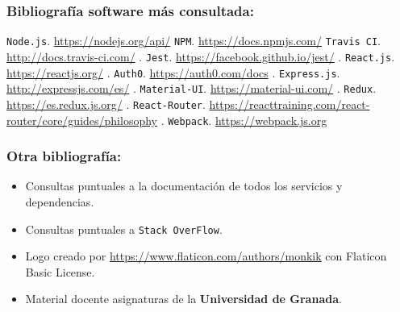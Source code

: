 \bigskip
\subsubsection*{Bibliografía software más consultada:}
 {\tt Node.js}. \url{https://nodejs.org/api/}
 {\tt NPM}. \url{https://docs.npmjs.com/}
 {\tt Travis CI}. \url{http://docs.travis-ci.com/}
. {\tt Jest}.  \url{https://facebook.github.io/jest/}
. {\tt React.js}.  \url{https://reactjs.org/}
. {\tt Auth0}.  \url{https://auth0.com/docs}
. {\tt Express.js}.  \url{http://expressjs.com/es/}
. {\tt Material-UI}.  \url{https://material-ui.com/}
. {\tt Redux}.  \url{https://es.redux.js.org/}
. {\tt React-Router}.  \url{https://reacttraining.com/react-router/core/guides/philosophy}
. {\tt Webpack}. \url{https://webpack.js.org}


\bigskip
\subsubsection*{Otra bibliografía:}
\begin{itemize}
  \item Consultas puntuales a la documentación de todos los servicios y dependencias.
	\item Consultas puntuales a {\tt Stack OverFlow}.
	\item Logo creado por \url{https://www.flaticon.com/authors/monkik} con Flaticon Basic License.
	\item Material docente asignaturas de la \textbf{Universidad de Granada}.
\end{itemize}
